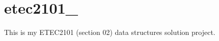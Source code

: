 \chapter{etec2101\+\_}
\hypertarget{index}{}\label{index}
\label{index_md__r_e_a_d_m_e}%
%


This is my ETEC2101 (section 02) data structures solution project. 